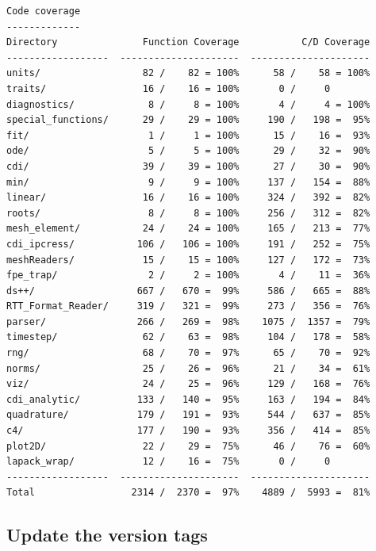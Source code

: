 \documentclass[note]{ResearchNote_pdf}
\begin{document}
\begin{lstlisting}[basicstyle=\footnotesize, xleftmargin=0.5in, 
  xrightmargin=0.5in]
Code coverage
-------------
Directory               Function Coverage           C/D Coverage
------------------  ---------------------  ---------------------
units/                  82 /    82 = 100%      58 /    58 = 100%
traits/                 16 /    16 = 100%       0 /     0       
diagnostics/             8 /     8 = 100%       4 /     4 = 100%
special_functions/      29 /    29 = 100%     190 /   198 =  95%
fit/                     1 /     1 = 100%      15 /    16 =  93%
ode/                     5 /     5 = 100%      29 /    32 =  90%
cdi/                    39 /    39 = 100%      27 /    30 =  90%
min/                     9 /     9 = 100%     137 /   154 =  88%
linear/                 16 /    16 = 100%     324 /   392 =  82%
roots/                   8 /     8 = 100%     256 /   312 =  82%
mesh_element/           24 /    24 = 100%     165 /   213 =  77%
cdi_ipcress/           106 /   106 = 100%     191 /   252 =  75%
meshReaders/            15 /    15 = 100%     127 /   172 =  73%
fpe_trap/                2 /     2 = 100%       4 /    11 =  36%
ds++/                  667 /   670 =  99%     586 /   665 =  88%
RTT_Format_Reader/     319 /   321 =  99%     273 /   356 =  76%
parser/                266 /   269 =  98%    1075 /  1357 =  79%
timestep/               62 /    63 =  98%     104 /   178 =  58%
rng/                    68 /    70 =  97%      65 /    70 =  92%
norms/                  25 /    26 =  96%      21 /    34 =  61%
viz/                    24 /    25 =  96%     129 /   168 =  76%
cdi_analytic/          133 /   140 =  95%     163 /   194 =  84%
quadrature/            179 /   191 =  93%     544 /   637 =  85%
c4/                    177 /   190 =  93%     356 /   414 =  85%
plot2D/                 22 /    29 =  75%      46 /    76 =  60%
lapack_wrap/            12 /    16 =  75%       0 /     0       
------------------  ---------------------  ---------------------
Total                 2314 /  2370 =  97%    4889 /  5993 =  81%
\end{lstlisting}


\subsection{Update the version tags}
\label{sec:update_tags}
\end{document}
